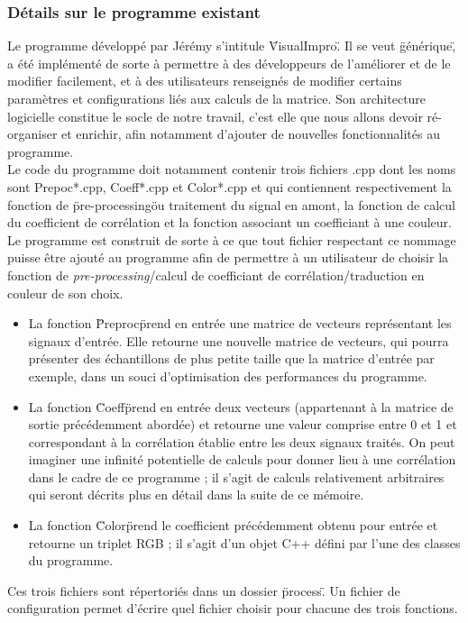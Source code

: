 \subsubsection{Détails sur le programme existant}
Le programme développé par Jérémy s'intitule \"VisualImpro\". Il se
veut \"générique\", a été implémenté de sorte à permettre à des
développeurs de l'améliorer et de le modifier facilement, et à des
utilisateurs renseignés de modifier certains paramètres et
configurations liés aux calculs de la matrice. Son architecture
logicielle constitue le socle de notre travail, c'est elle que nous
allons devoir ré-organiser et enrichir, afin notamment d'ajouter de
nouvelles fonctionnalités au programme. \\
Le code du programme doit notamment contenir trois fichiers .cpp dont
les noms sont Prepoc*.cpp, Coeff*.cpp et Color*.cpp et qui contiennent
respectivement la fonction de \"pre-processing\" ou traitement du
signal en amont, la fonction de calcul du coefficient de corrélation
et la fonction associant un coefficiant à une couleur. Le programme
est construit de sorte à ce que tout fichier respectant ce nommage
puisse être ajouté au programme afin de permettre à un utilisateur de
choisir la fonction de \textit{pre-processing}/calcul de coefficiant
de corrélation/traduction en couleur de son choix.
\begin{itemize}
 \item La fonction \"Preproc\" prend en entrée une matrice de
       vecteurs représentant les signaux d'entrée. Elle retourne une
       nouvelle matrice de vecteurs, qui pourra présenter des
       échantillons de plus petite taille que la matrice d'entrée par
       exemple, dans un souci d'optimisation des performances du
       programme.
 \item La fonction \"Coeff\" prend en entrée deux vecteurs
       (appartenant à la matrice de sortie précédemment abordée) et
       retourne une valeur comprise entre 0 et 1 et correspondant à la
       corrélation établie entre les deux signaux traités. On peut
       imaginer une infinité potentielle de calculs pour donner lieu à
       une corrélation dans le cadre de ce programme ; il s'agit de
       calculs relativement arbitraires qui seront décrits plus en détail
       dans la suite de ce mémoire.
 \item La fonction \"Color\" prend le coefficient précédemment obtenu
       pour entrée et retourne un triplet RGB ; il s'agit d'un objet C++
       défini par l'une des classes du programme.
\end{itemize}
Ces trois fichiers sont répertoriés dans un dossier \"process\". Un
fichier de configuration permet d'écrire quel fichier choisir pour
chacune des trois fonctions. \\

